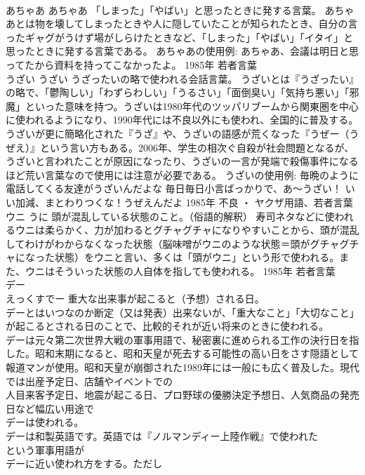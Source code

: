 \documentclass[8pt]{extreport}
\begin{document}
\begin{CJK}{UTF8}{min}
\\	あちゃあ	あちゃあ	「しまった」「やばい」と思ったときに発する言葉。	あちゃあとは物を壊してしまったときや人に隠していたことが知られたとき、自分の言ったギャグがうけず場がしらけたときなど、「しまった」「やばい」「イタイ」と思ったときに発する言葉である。 あちゃあの使用例: あちゃあ、会議は明日と思ってたから資料を持ってこなかったよ。	1985年	若者言葉	
\\	うざい	うざい	うざったいの略で使われる会話言葉。	うざいとは『うざったい』の略で、「鬱陶しい」「わずらわしい」「うるさい」「面倒臭い」「気持ち悪い」「邪魔」といった意味を持つ。うざいは1980年代のツッパリブームから関東圏を中心に使われるようになり、1990年代には不良以外にも使われ、全国的に普及する。うざいが更に簡略化された『うざ』や、うざいの語感が荒くなった『うぜー（うぜえ）』という言い方もある。2006年、学生の相次ぐ自殺が社会問題となるが、うざいと言われたことが原因になったり、うざいの一言が発端で殺傷事件になるほど荒い言葉なので使用には注意が必要である。 うざいの使用例: 毎晩のように電話してくる友達がうざいんだよな 毎日毎日小言ばっかりで、あ～うざい！ いい加減、まとわりつくな！うぜえんだよ	1985年	不良 ・ ヤクザ用語、若者言葉	
\\	ウニ	うに	頭が混乱している状態のこと。（俗語的解釈）	寿司ネタなどに使われるウニは柔らかく、力が加わるとグチャグチャになりやすいことから、頭が混乱してわけがわからなくなった状態（脳味噌がウニのような状態＝頭がグチャグチャになった状態）をウニと言い、多くは「頭がウニ」という形で使われる。また、ウニはそういった状態の人自体を指しても使われる。	1985年	若者言葉	
\\	デー 
\\	えっくすでー	重大な出来事が起こると（予想）される日。	
\\	デーとはいつなのか断定（又は発表）出来ないが、「重大なこと」「大切なこと」が起こるとされる日のことで、比較的それが近い将来のときに使われる。
\\	デーは元々第二次世界大戦の軍事用語で、秘密裏に進められる工作の決行日を指した。昭和末期になると、昭和天皇が死去する可能性の高い日をさす隠語として報道マンが使用。昭和天皇が崩御された1989年には一般にも広く普及した。現代では出産予定日、店舗やイベントでの
\\	人目来客予定日、地震が起こる日、プロ野球の優勝決定予想日、人気商品の発売日など幅広い用途で
\\	デーは使われる。 
\\	デーは和製英語です。英語では『ノルマンディー上陸作戦』で使われた
\\	という軍事用語が
\\	デーに近い使われ方をする。ただし

\end{CJK}
\end{document}
